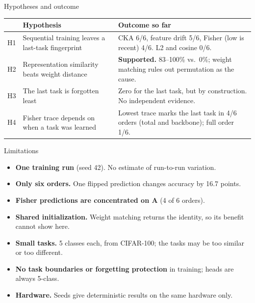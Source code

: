 \documentclass[aspectratio=169,11pt]{beamer}
\begin{document}
\begin{frame}{Hypotheses and outcome}
  \small
  \renewcommand{\arraystretch}{1.3}
  \begin{tabular}{@{}p{0.6cm}p{4.6cm}p{6.6cm}@{}}
    \toprule
    & \textbf{Hypothesis} & \textbf{Outcome so far}\\
    \midrule
    H1 & Sequential training leaves a last-task fingerprint & CKA 6/6, feature drift 5/6, Fisher (low is recent) 4/6. L2 and cosine 0/6.\\
    H2 & Representation similarity beats weight distance & \textbf{Supported.} 83--100\% vs.\ 0\%; weight matching rules out permutation as the cause.\\
    H3 & The last task is forgotten least & Zero for the last task, but by construction. No independent evidence.\\
    H4 & Fisher trace depends on when a task was learned & Lowest trace marks the last task in 4/6 orders (total and backbone); full order 1/6.\\
    \bottomrule
  \end{tabular}
\end{frame}

\begin{frame}{Limitations}
  \begin{itemize}
    \item \textbf{One training run} (seed 42). No estimate of run-to-run variation.
    \item \textbf{Only six orders.} One flipped prediction changes accuracy by 16.7 points.
    \item \textbf{Fisher predictions are concentrated on A} (4 of 6 orders).
    \item \textbf{Shared initialization.} Weight matching returns the identity, so its benefit cannot show here.
    \item \textbf{Small tasks.} 5 classes each, from CIFAR-100; the tasks may be too similar or too different.
    \item \textbf{No task boundaries or forgetting protection} in training; heads are always 5-class.
    \item \textbf{Hardware.} Seeds give deterministic results on the same hardware only.
  \end{itemize}
\end{frame}
\end{document}
